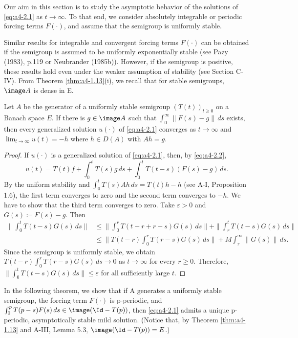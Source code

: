 \bigskip
\noindent
Our aim in this section is to study the asymptotic behavior of the solutions of \eqref{eq:a4-2.1} as $t \to \infty$. 
To that end, we consider absolutely integrable or periodic forcing terms $F(\cdot)$, and assume that the semigroup
is uniformly stable.

\noindent
Similar results for integrable and convergent forcing terms $F(\cdot)$ can
be obtained if the semigroup is assumed to be uniformly exponentially
stable (see Pazy (1983), p.119 or Neubrander (1985b)). 
However, if the
semigroup is positive, these results hold even under the weaker assumption of stability (see Section C-IV).
From Theorem \ref{thm:a4-1.13}(i), we recall that for stable
semigroups, $\image A$ is dense in E.

\begin{theorem}\label{thm:a4-2.1}
Let $A$ be the generator of a uniformly stable semigroup
$(T(t))_{t \geq 0}$ on a Banach space $E$. 
If there is $g \in \image A$ such that
$\int_{0}^{\infty} \|F(s) - g\| \, ds$ exists, then every generalized solution $u(\cdot)$ of
\eqref{eq:a4-2.1} converges as $t \to \infty$ and $\lim_{t \to \infty} u(t) = -h$ where $h \in D(A)$ with
$Ah = g$.
\end{theorem}

\begin{proof}
If $u(\cdot)$ is a generalized solution of \eqref{eq:a4-2.1}, then, by \eqref{eq:a4-2.2},
\[
u(t) = T(t)f + \int_{0}^{t} T(s)g \, ds + \int_{0}^{t} T(t-s)(F(s)-g) \, ds.
\]
By the uniform
stability and $\int_0^t T(s)Ah\, ds = T(t)h - h$ (see A-I, Proposition 1.6), the first term converges to zero
and the second term converges to $-h$. 
We have to show that the
third term converges to zero. 
Take $\varepsilon > 0$ and $G(s) \coloneqq F(s)-g$. 
Then
\begin{align*}
\|\int_{0}^{t} T(t-s)G(s) \, ds\| &\leq \|\int_{0}^{r} T(t-r+r-s)G(s) \, ds\| + \|\int_{r}^{t} T(t-s)G(s) \, ds\|\\
&\leq \|T(t-r)\int_{0}^{r} T(r-s)G(s) \, ds\| + M \int_{r}^{\infty} \|G(s)\| \, ds.
\end{align*}
Since the semigroup is uniformly stable, we obtain
$T(t-r)\int_{0}^{r} T(r-s)G(s) \, ds \to 0$ as $t \to \infty$ for every $r \geq 0$.
Therefore, $\|\int_{0}^{t} T(t-s)G(s) \, ds\| \leq \varepsilon$ for all sufficiently large $t$.
\end{proof}
\noindent
In the following theorem, we show that if A generates a
uniformly stable semigroup, the forcing term $F(\cdot)$ is p-periodic,
and $\int_{0}^{p} T(p-s)F(s) \, ds \in \image(\Id - T(p))$, then \eqref{eq:a4-2.1}
admits a unique p-periodic, asymptotically stable mild solution. (Notice that, by
Theorem \ref{thm:a4-1.13} and A-III, Lemma 5.3, $\image(\Id - T(p)) = E$.)

